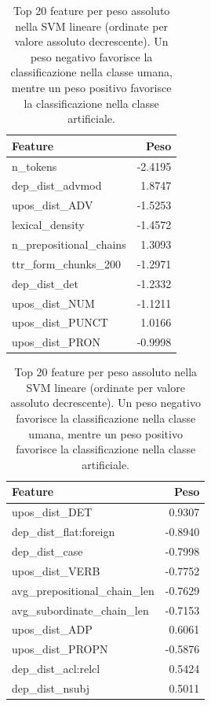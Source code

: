 \documentclass{article}
\begin{document}
\begin{table}[h]
\centering

\begin{minipage}{0.48\textwidth}
\centering
\begin{tabular}{lr}
\toprule
\textbf{Feature} & \textbf{Peso} \\
\midrule
n\_tokens & -2.4195 \\
dep\_dist\_advmod & 1.8747 \\
upos\_dist\_ADV & -1.5253 \\
lexical\_density & -1.4572 \\
n\_prepositional\_chains & 1.3093 \\
ttr\_form\_chunks\_200 & -1.2971 \\
dep\_dist\_det & -1.2332 \\
upos\_dist\_NUM & -1.1211 \\
upos\_dist\_PUNCT & 1.0166 \\
upos\_dist\_PRON & -0.9998 \\
\bottomrule
\end{tabular}
\end{minipage}
\hfill
\begin{minipage}{0.48\textwidth}
\centering
\begin{tabular}{lr}
\toprule
\textbf{Feature} & \textbf{Peso} \\
\midrule
upos\_dist\_DET & 0.9307 \\
dep\_dist\_flat:foreign & -0.8940 \\
dep\_dist\_case & -0.7998 \\
upos\_dist\_VERB & -0.7752 \\
avg\_prepositional\_chain\_len & -0.7629 \\
avg\_subordinate\_chain\_len & -0.7153 \\
upos\_dist\_ADP & 0.6061 \\
upos\_dist\_PROPN & -0.5876 \\
dep\_dist\_acl:relcl & 0.5424 \\
dep\_dist\_nsubj & 0.5011 \\
\bottomrule
\end{tabular}
\end{minipage}

\caption{Top 20 feature per peso assoluto nella SVM lineare (ordinate per valore assoluto decrescente). Un peso negativo favorisce la classificazione nella classe umana, mentre un peso positivo favorisce la classificazione nella classe artificiale.}
\label{tab:top_features}
\end{table}
\end{document}
